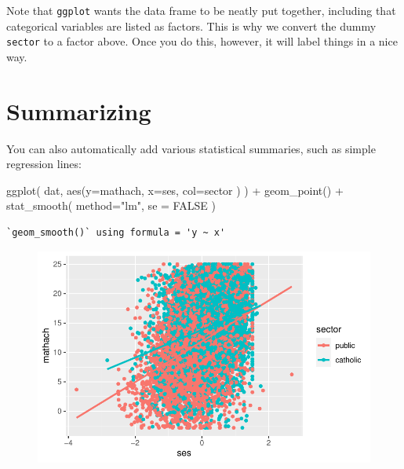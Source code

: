 \documentclass[
  letterpaper,
  DIV=11,
  numbers=noendperiod]{scrreprt}
\newenvironment{Shaded}{\begin{snugshade}}{\end{snugshade}}
\newcommand{\AttributeTok}[1]{\textcolor[rgb]{0.49,0.56,0.16}{#1}}
\newcommand{\ConstantTok}[1]{\textcolor[rgb]{0.53,0.00,0.00}{#1}}
\newcommand{\FunctionTok}[1]{\textcolor[rgb]{0.02,0.16,0.49}{#1}}
\newcommand{\NormalTok}[1]{\textcolor[rgb]{0.00,0.44,0.13}{#1}}
\newcommand{\SpecialCharTok}[1]{\textcolor[rgb]{0.25,0.44,0.63}{#1}}
\newcommand{\StringTok}[1]{\textcolor[rgb]{0.25,0.44,0.63}{#1}}
\begin{document}
Note that \texttt{ggplot} wants the data frame to be neatly put
together, including that categorical variables are listed as factors.
This is why we convert the dummy \texttt{sector} to a factor above. Once
you do this, however, it will label things in a nice way.

\hypertarget{summarizing}{%
\section{Summarizing}\label{summarizing}}

You can also automatically add various statistical summaries, such as
simple regression lines:

\begin{Shaded}
\begin{Highlighting}[]
\FunctionTok{ggplot}\NormalTok{( dat, }\FunctionTok{aes}\NormalTok{(}\AttributeTok{y=}\NormalTok{mathach, }\AttributeTok{x=}\NormalTok{ses, }\AttributeTok{col=}\NormalTok{sector ) ) }\SpecialCharTok{+} 
    \FunctionTok{geom\_point}\NormalTok{() }\SpecialCharTok{+} 
    \FunctionTok{stat\_smooth}\NormalTok{( }\AttributeTok{method=}\StringTok{"lm"}\NormalTok{, }\AttributeTok{se =} \ConstantTok{FALSE}\NormalTok{ )}
\end{Highlighting}
\end{Shaded}

\begin{verbatim}
`geom_smooth()` using formula = 'y ~ x'
\end{verbatim}

\begin{figure}[H]

{\centering \includegraphics{intro_ggplot_files/figure-pdf/unnamed-chunk-4-1.pdf}

}

\end{figure}
\end{document}

